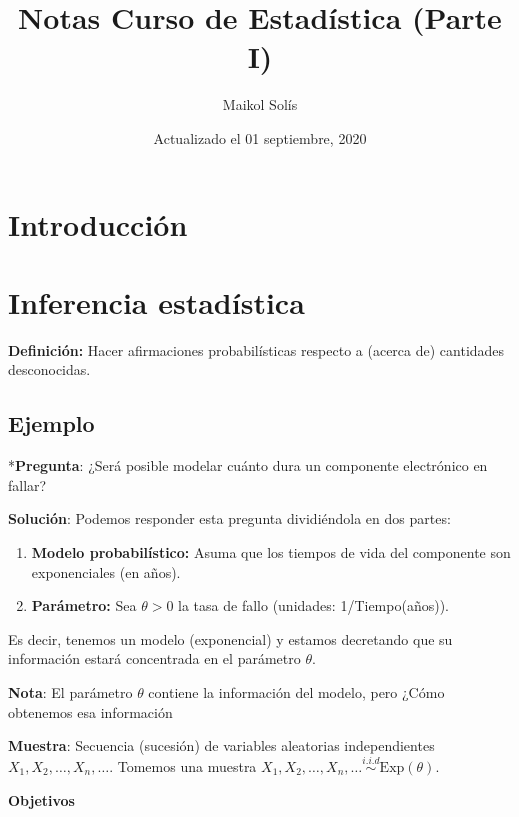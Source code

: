 \documentclass[
  12pt,
]{book}
\title{Notas Curso de Estadística (Parte I)}
\author{Maikol Solís}
\date{Actualizado el 01 septiembre, 2020}
\providecommand{\tightlist}{%
  \setlength{\itemsep}{0pt}\setlength{\parskip}{0pt}}
\begin{document}
\maketitle

{
\hypersetup{linkcolor=}
\setcounter{tocdepth}{4}
\tableofcontents
}
\hypertarget{introducciuxf3n}{%
\chapter{Introducción}\label{introducciuxf3n}}

\hypertarget{inferencia-estaduxedstica}{%
\chapter{Inferencia estadística}\label{inferencia-estaduxedstica}}

\textbf{Definición:} Hacer afirmaciones probabilísticas respecto a (acerca de)
cantidades desconocidas.

\hypertarget{ejemplo}{%
\section{Ejemplo}\label{ejemplo}}

*\textbf{Pregunta}: ¿Será posible modelar cuánto dura un componente electrónico en
fallar?

\textbf{Solución}: Podemos responder esta pregunta dividiéndola en dos partes:

\begin{enumerate}
\def\labelenumi{\arabic{enumi}.}
\tightlist
\item
  \textbf{Modelo probabilístico:} Asuma que los tiempos de vida del componente son
  exponenciales (en años).
\item
  \textbf{Parámetro:} Sea \(\theta > 0\) la tasa de fallo (unidades: 1/Tiempo(años)).
\end{enumerate}

Es decir, tenemos un modelo (exponencial) y estamos decretando que su información estará concentrada en el parámetro \(\theta\).

\textbf{Nota}: El parámetro \(\theta\) contiene la información del modelo,
pero ¿Cómo obtenemos esa información

\textbf{Muestra}: Secuencia (sucesión) de variables aleatorias independientes \(X_1,X_2,\dots, X_n,\dots\). Tomemos una muestra \(X_1,X_2,\dots, X_n,\dots \stackrel{i.i.d}{\sim} \text{Exp}(\theta)\).

\textbf{Objetivos}
\end{document}
